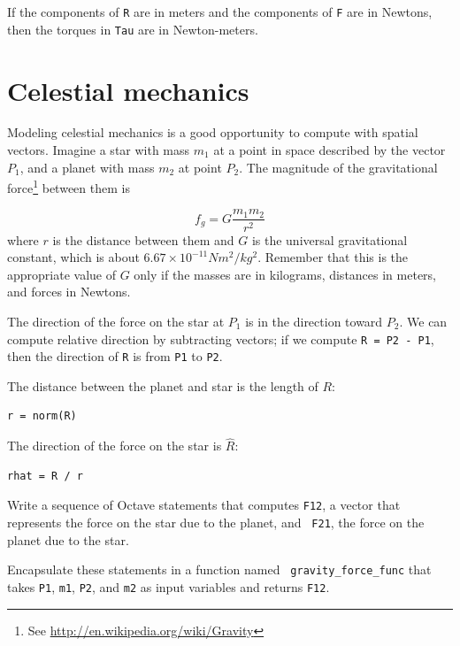 \documentclass{book}
\begin{document}
If the components of {\tt R} are in meters and the components
of {\tt F} are in Newtons, then the torques in {\tt Tau} are
in Newton-meters.



\section{Celestial mechanics}

Modeling celestial mechanics is a good opportunity
to compute with spatial vectors.
Imagine a star with mass $m_1$ at a point in space described by the
vector $P_1$, and a planet with mass $m_2$ at point $P_2$. The
magnitude of the gravitational force\footnote{See
\url{http://en.wikipedia.org/wiki/Gravity}} between them is

\[ f_g = G \frac{m_1 m_2}{r^2} \]
%
where $r$ is the distance between them and $G$ is the universal
gravitational constant, which is about $6.67 \times 10^{-11} N m^2 /
kg^2$. Remember that this is the appropriate value of $G$ only if the
masses are in kilograms, distances in meters, and forces in Newtons.

The direction of the force on the star at $P_1$ is in the
direction toward $P_2$. We can compute relative direction by
subtracting vectors; if we compute {\tt R = P2 - P1}, then
the direction of {\tt R} is from {\tt P1} to {\tt P2}.

The distance between the planet and star is the length of $R$:

\begin{verbatim}
r = norm(R)
\end{verbatim}

The direction of the force on the star is $\hat{R}$:

\begin{verbatim}
rhat = R / r
\end{verbatim}

\begin{ex}
Write a sequence of Octave statements that computes {\tt F12}, a vector
that represents the force on the star due to the planet, and {\tt
F21}, the force on the planet due to the star.
\end{ex}

\begin{ex}
Encapsulate these statements in a function named {\tt
gravity\_force\_func} that takes {\tt P1}, {\tt m1}, {\tt P2}, and
{\tt m2} as input variables and returns {\tt F12}.
\end{ex}
\end{document}
